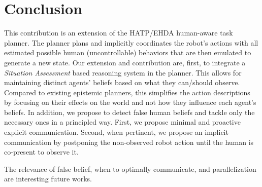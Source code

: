 




\section{Conclusion}

This contribution is an extension of the HATP/EHDA human-aware task planner. 
The planner plans and implicitly coordinates the robot's actions with all estimated possible human (uncontrollable) behaviors that are then emulated to generate a new state.
Our extension and contribution are, first, to integrate a \textit{Situation Assessment} based reasoning system in the planner. This allows for maintaining distinct agents' beliefs based on what they can/should observe.
Compared to existing epistemic planners, this simplifies the action descriptions by focusing on their effects on the world and not how they influence each agent's beliefs.
In addition, we propose to detect false human beliefs and tackle only the necessary ones in a principled way. First, we propose minimal and proactive explicit communication. Second, when pertinent, 
we propose an implicit communication by postponing the non-observed robot action until the human is co-present to observe it.  

The relevance of false belief, when to optimally communicate, and parallelization are interesting future works.